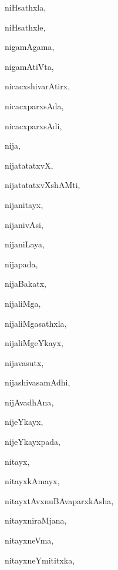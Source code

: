 \begin{multicols}{3}
{\noindent
{niHsathxla}, \pageref{niHsathxla}

\noindent
{niHsathxle}, \pageref{niHsathxle}

\noindent
{nigamAgama}, \pageref{nigamAgama}

\noindent
{nigamAtiVta}, \pageref{nigamAtiVta}

\noindent
{nicacxshivarAtirx}, \pageref{nicacxshivarAtirx}

\noindent
{nicacxparxsAda}, \pageref{nicacxparxsAda}

\noindent
{nicacxparxsAdi}, \pageref{nicacxparxsAdi}

\noindent
{nija}, \pageref{nija}

\noindent
{nijatatatxvX}, \pageref{nijatatatxvX}

\noindent
{nijatatatxvXshAMti}, \pageref{nijatatatxvXshAMti}

\noindent
{nijanitayx}, \pageref{nijanitayx}

\noindent
{nijanivAsi}, \pageref{nijanivAsi}

\noindent
{nijaniLaya}, \pageref{nijaniLaya}

\noindent
{nijapada}, \pageref{nijapada}

\noindent
{nijaBakatx}, \pageref{nijaBakatx}

\noindent
{nijaliMga}, \pageref{nijaliMga}

\noindent
{nijaliMgasathxla}, \pageref{nijaliMgasathxla}

\noindent
{nijaliMgeYkayx}, \pageref{nijaliMgeYkayx}

\noindent
{nijavasutx}, \pageref{nijavasutx}

\noindent
{nijashivasamAdhi}, \pageref{nijashivasamAdhi}

\noindent
{nijAvadhAna}, \pageref{nijAvadhAna}

\noindent
{nijeYkayx}, \pageref{nijeYkayx}

\noindent
{nijeYkayxpada}, \pageref{nijeYkayxpada}

\noindent
{nitayx}, \pageref{nitayx}

\noindent
{nitayxkAmayx}, \pageref{nitayxkAmayx}

\noindent
{nitayxtAvxnuBAvaparxkAsha}, \pageref{nitayxtAvxnuBAvaparxkAsha}

\noindent
{nitayxniraMjana}, \pageref{nitayxniraMjana}

\noindent
{nitayxneVma}, \pageref{nitayxneVma}

\noindent
{nitayxneYmititxka}, \pageref{nitayxneYmititxka}

}
\end{multicols}
